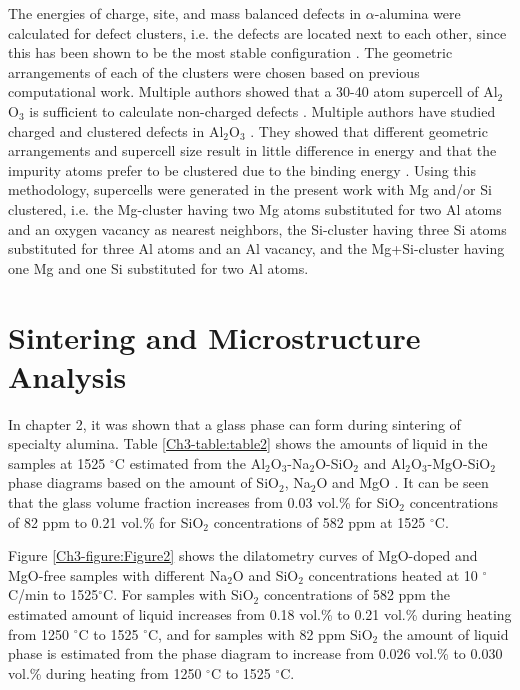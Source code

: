 The energies of charge, site, and mass balanced defects in $\alpha$-alumina were calculated for defect clusters, i.e. the defects are located next to each other, since this has been shown to be the most stable configuration \cite{Atkinson2003}. The geometric arrangements of each of the clusters were chosen based on previous computational work. Multiple authors showed that a 30-40 atom supercell of Al$_{2}$O$_{3}$ is sufficient to calculate non-charged defects \cite{Atkinson2003,Grimes1994,Lagerlof1998,Xiang2015,Sarsam2013}. Multiple authors have studied charged and clustered defects in Al$_{2}$O$_{3}$ \cite{Atkinson2003,Grimes1994,Lagerlof1998,Xiang2015,Sarsam2013}. They showed that different geometric arrangements and supercell size result in little difference in energy and that the impurity atoms prefer to be clustered due to the binding energy \cite{Atkinson2003,Grimes1994,Lagerlof1998,Xiang2015,Sarsam2013}. Using this methodology, supercells were generated in the present work with Mg and/or Si clustered, i.e. the Mg-cluster having two Mg atoms substituted for two Al atoms and an oxygen vacancy as nearest neighbors, the Si-cluster having three Si atoms substituted for three Al atoms and an Al vacancy, and the Mg+Si-cluster having one Mg and one Si substituted for two Al atoms. 


\section{Sintering and Microstructure Analysis}

In chapter 2, it was shown that a glass phase can form during sintering of specialty alumina. Table \ref{Ch3-table:table2} shows the amounts of liquid in the samples at 1525 $^{\circ}$C estimated from the Al$_{2}$O$_{3}$-Na$_{2}$O-SiO$_{2}$ and Al$_{2}$O$_{3}$-MgO-SiO$_{2}$ phase diagrams based on the amount of SiO$_{2}$, Na$_{2}$O and MgO \cite{Mao2005}. It can be seen that the glass volume fraction increases from 0.03 vol.\% for SiO$_{2}$ concentrations of 82 ppm to 0.21 vol.\% for SiO$_{2}$ concentrations of 582 ppm at 1525 $^{\circ}$C. 

Figure \ref{Ch3-figure:Figure2} shows the dilatometry curves of MgO-doped and MgO-free \cite{Frueh2016} samples with different Na$_{2}$O and SiO$_{2}$ concentrations heated at 10 $^{\circ}$C/min to 1525$^{\circ}$C. For samples with SiO$_{2}$ concentrations of 582 ppm the estimated amount of liquid increases from 0.18 vol.\% to 0.21 vol.\% during heating from 1250 $^{\circ}$C to 1525 $^{\circ}$C, and for samples with 82 ppm SiO$_{2}$ the amount of liquid phase is estimated from the phase diagram to increase from 0.026 vol.\% to 0.030 vol.\% during heating from 1250 $^{\circ}$C to 1525 $^{\circ}$C. 

